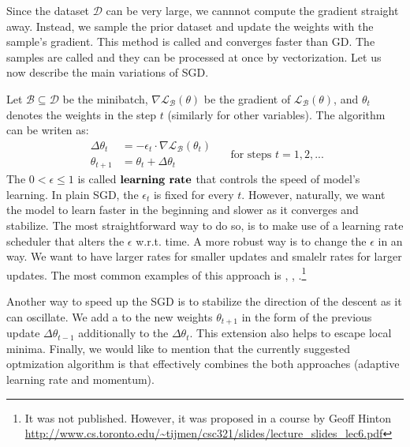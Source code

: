 Since the dataset $\mathcal{D}$ can be very large, we cannnot compute the
gradient straight away. Instead, we sample the prior dataset and update the
weights with the sample's gradient. This method is called  and converges faster than GD. The samples are called
 and they can be processed at once by vectorization. Let us now
describe the main variations of SGD.

 Let $\mathcal{B} \subseteq \mathcal{D}$ be
the minibatch, $\nabla\mathcal{L_\mathcal{B}(\theta)}$ be the gradient of
$\mathcal{L}_\mathcal{B}(\theta)$, and $\theta_t$ denotes the weights in the
step $t$ (similarly for other variables). The algorithm can be writen as:
$$
    \begin{array}{rl}
        \Delta\theta_{t} & = - \epsilon_{t} \cdot \nabla{\mathcal{L}_\mathcal{B}(\theta_{t})} \\
        \theta_{t+1}     & = \theta_{t} + \Delta\theta_{t}
    \end{array}
    \quad \text{ for steps } t = 1,2,...
$$
The $0 < \epsilon \leq 1$ is called $\textbf{learning rate}$ that controls the
speed of model's learning. In plain SGD, the $\epsilon_t$ is fixed for every
$t$. However, naturally, we want the model to learn faster in the beginning and
slower as it converges and stabilize. The most straightforward way to do so, is
to make use of a learning rate scheduler that alters the $\epsilon$ w.r.t. time.
A more robust way is to change the $\epsilon$ in an  way. We want
to have larger rates for smaller updates and smalelr rates for larger updates.
The most common examples of this approach is  \cite{adagrad},
 \cite{adadelta}, .\footnote{It was not published.
    However, it was proposed in a course by Geoff Hinton \url{
        http://www.cs.toronto.edu/~tijmen/csc321/slides/lecture_slides_lec6.pdf}
}

Another way to speed up the SGD is to stabilize the direction of the descent as
it can oscillate. We add a  to the new weights $\theta_{t+1}$ in
the form of the previous update $\Delta\theta_{t-1}$ additionally to the
$\Delta\theta_{t}$. This extension also helps to escape local minima. Finally,
we would like to mention that the currently suggested optmization algorithm is
 \cite{adam} that effectively combines the both approaches (adaptive
learning rate and momentum).

